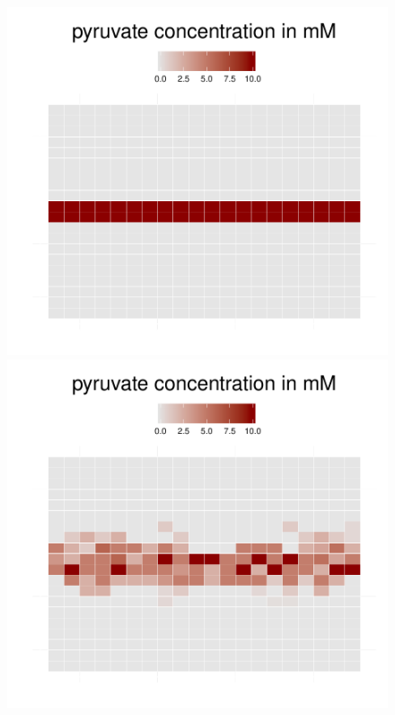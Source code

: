\begin{figure}[h]
  \centering
  \begin{minipage}[t]{0.3\textwidth}
    \includegraphics[width=\textwidth]{diff1.pdf}
  \end{minipage}
  \begin{minipage}[t]{0.3\textwidth}
    \includegraphics[width=\textwidth]{diff2.pdf}

\end{minipage}
\end{figure}
